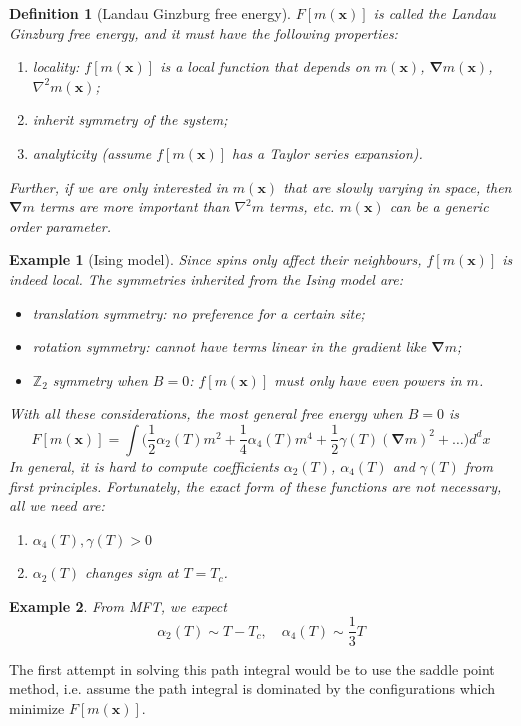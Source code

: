 \documentclass[a4paper]{article}
\newtheorem{eg}{Example}[section]
\theoremstyle{new}
\newtheorem{defi}{Definition}[section]
\begin{document}
\begin{defi}[Landau Ginzburg free energy]
$F[m(\mathbf{x})]$ is called the Landau Ginzburg free energy, and it must have the following properties:
\begin{enumerate}
    \item locality: $f[m(\mathbf{x})]$ is a local function that depends on $m(\mathbf{x})$, $\boldsymbol{\nabla}m(\mathbf{x})$, $\nabla^2m(\mathbf{x})$;
    \item inherit symmetry of the system;
    \item analyticity (assume $f[m(\mathbf{x})]$ has a  Taylor series expansion).
\end{enumerate}
Further, if we are only interested in $m(\mathbf{x})$ that are slowly varying in space, then $\boldsymbol{\nabla}m$ terms are more important than $\nabla^2m$ terms, etc. $m(\mathbf{x})$ can be a generic order parameter.
\end{defi}
\begin{eg}[Ising model]
Since spins only affect their neighbours, $f[m(\mathbf{x})]$ is indeed local. The symmetries inherited from the Ising model are:
\begin{itemize}
    \item translation symmetry: no preference for a certain site;
    \item rotation symmetry: cannot have terms linear in the gradient like $\boldsymbol{\nabla}m$;
    \item $\mathbb{Z}_2$ symmetry when $B=0$: $f[m(\mathbf{x})]$ must only have even powers in $m$.
\end{itemize}
With all these considerations, the most general free energy when $B=0$ is
$$F[m(\mathbf{x})]=\int\bigg(\frac{1}{2}\alpha_2(T)m^2+\frac{1}{4}\alpha_4(T)m^4+\frac{1}{2}\gamma(T)(\boldsymbol{\nabla}m)^2+\dots\bigg)d^dx$$
In general, it is hard to compute coefficients $\alpha_2(T)$, $\alpha_4(T)$ and $\gamma(T)$ from first principles. Fortunately, the exact form of these functions are not necessary, all we need are:
\begin{enumerate}
    \item $\alpha_4(T),\gamma(T)>0$
    \item $\alpha_2(T)$ changes sign at $T=T_c$.
\end{enumerate}
\end{eg}
\begin{eg}
From MFT, we expect
$$\alpha_2(T)\sim T-T_c,\quad\alpha_4(T)\sim\frac{1}{3}T$$
\end{eg}
The first attempt in solving this path integral would be to use the saddle point method, i.e. assume the path integral is dominated by the configurations which minimize $F[m(\mathbf{x})]$. 
\end{document}
